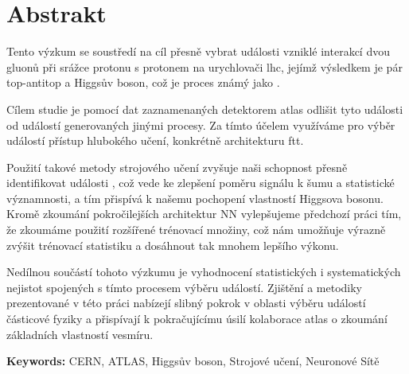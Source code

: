 \chapter*{Abstrakt}

Tento výzkum se soustředí na cíl přesně vybrat události vzniklé interakcí dvou gluonů při srážce protonu s protonem na
urychlovači \acrshort{lhc}, jejímž výsledkem je pár top-antitop a Higgsův boson, což je proces známý jako \tth.

Cílem studie je pomocí dat zaznamenaných detektorem \acrshort{atlas} odlišit tyto události \tth od událostí generovaných
jinými procesy. Za tímto účelem využíváme pro výběr událostí přístup hlubokého učení, konkrétně architekturu
\acrshort{ftt}.

Použití takové metody strojového učení zvyšuje naši schopnost přesně identifikovat události \tth, což vede ke zlepšení
poměru signálu k šumu a statistické významnosti, a tím přispívá k našemu pochopení vlastností Higgsova bosonu. Kromě
zkoumání pokročilejších architektur NN vylepšujeme předchozí práci tím, že zkoumáme použití rozšířené trénovací množiny,
což nám umožňuje výrazně zvýšit trénovací statistiku a dosáhnout tak mnohem lepšího výkonu.

Nedílnou součástí tohoto výzkumu je vyhodnocení statistických i systematických nejistot spojených s tímto procesem
výběru událostí. Zjištění a metodiky prezentované v této práci nabízejí slibný pokrok v oblasti výběru událostí
částicové fyziky a přispívají k pokračujícímu úsilí kolaborace \acrshort{atlas} o zkoumání základních vlastností
vesmíru.

\vspace{3mm}
\noindent
\textbf{Keywords:}
CERN, ATLAS, Higgsův boson, Strojové učení, Neuronové Sítě
